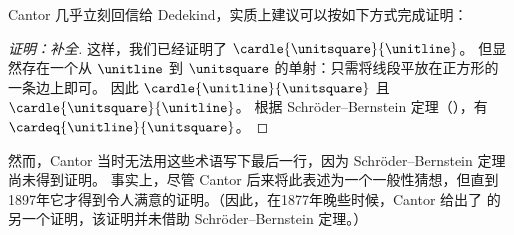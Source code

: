 \documentclass[../../../include/open-logic-section]{subfiles}
\begin{document}
Cantor 几乎立刻回信给 Dedekind，实质上建议可以按如下方式完成证明：

\begin{proof}[证明：补全]
这样，我们已经证明了 $\cardle{\unitsquare}{\unitline}$。
但显然存在一个从 $\unitline$ 到 $\unitsquare$ 的单射：只需将线段平放在正方形的一条边上即可。
因此 $\cardle{\unitline}{\unitsquare}$ 且 $\cardle{\unitsquare}{\unitline}$。
根据 Schr\"{o}der--Bernstein 定理（），有 $\cardeq{\unitline}{\unitsquare}$。
\end{proof}

然而，Cantor 当时无法用这些术语写下最后一行，因为 Schr\"{o}der--Bernstein 定理尚未得到证明。
事实上，尽管 Cantor 后来将此表述为一个一般性猜想，但直到1897年它才得到令人满意的证明。（因此，在1877年晚些时候，Cantor 给出了  的另一个证明，该证明并未借助 Schr\"{o}der--Bernstein 定理。）
\end{document}
